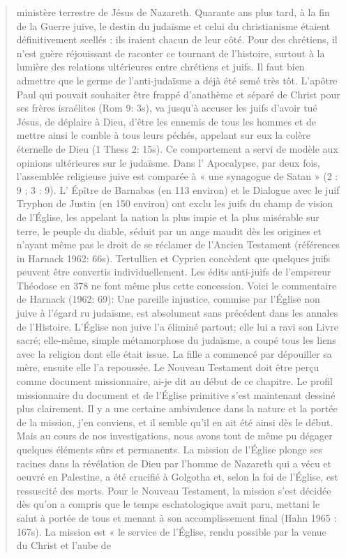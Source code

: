 \begin{quote}
    ministère terrestre de Jésus de Nazareth. Quarante ans plus tard, à la fin
de la Guerre juive, le destin du judaïsme et celui du christianisme
étaient définitivement scellés : ils iraient chacun de leur côté.
Pour des chrétiens, il n'est guère réjouissant de raconter ce tournant
de l'histoire, surtout à la lumière des relations ultérieures entre
chrétiens et juifs. Il faut bien admettre que le germe de l'anti-judaïsme
a déjà été semé très tôt. L'apôtre Paul qui pouvait souhaiter être frappé
d'anathème et séparé de Christ pour ses frères israélites (Rom 9: 3s),
va jusqu'à accuser les juifs d'avoir tué Jésus, de déplaire à Dieu, d'être
les ennemis de tous les hommes et de mettre ainsi le comble à tous
leurs péchés, appelant sur eux la colère éternelle de Dieu (1 Thess
2: 15s). Ce comportement a servi de modèle aux opinions ultérieures
sur le judaïsme. Dans l' Apocalypse, par deux fois, l'assemblée
religieuse juive est comparée à « une synagogue de Satan » (2 : 9 ;
3 : 9). L' Épître de Barnabas (en 113 environ) et le Dialogue avec le
juif Tryphon de Justin (en 150 environ) ont exclu les juifs du champ
de vision de l'Église, les appelant la nation la plus impie et la plus
misérable sur terre, le peuple du diable, séduit par un ange maudit dès
les origines et n'ayant même pas le droit de se réclamer de l'Ancien
Testament (références in Harnack 1962: 66s). Tertullien et Cyprien
concèdent que quelques juifs peuvent être convertis individuellement.
Les édits anti-juifs de l'empereur Théodose en 378 ne font même plus
cette concession. Voici le commentaire de Harnack (1962: 69):
Une pareille injustice, commise par l'Église non juive à l'égard ru
judaïsme, est absolument sans précédent dans les annales de l'Histoire.
L'Église non juive l'a éliminé partout; elle lui a ravi son Livre sacré;
elle-même, simple métamorphose du judaïsme, a coupé tous les liens avec
la religion dont elle était issue. La fille a commencé par dépouiller sa
mère, ensuite elle l'a repoussée.
Le Nouveau Testament doit être perçu comme document
missionnaire, ai-je dit au début de ce chapitre. Le profil missionnaire
du document et de l'Église primitive s'est maintenant dessiné plus
clairement. Il y a une certaine ambivalence dans la nature et la portée
de la mission, j'en conviens, et il semble qu'il en ait été ainsi dès le
début. Mais au cours de nos investigations, nous avons tout de même
pu dégager quelques éléments sûrs et permanents. La mission de
l'Église plonge ses racines dans la révélation de Dieu par l'homme de
Nazareth qui a vécu et oeuvré en Palestine, a été crucifié à Golgotha et,
selon la foi de l'Église, est ressuscité des morts. Pour le Nouveau
Testament, la mission s'est décidée dès qu'on a compris que le temps
eschatologique avait paru, mettani le salut à portée de tous et menant à
son accomplissement final (Hahn 1965 : 167s). La mission est « le
service de l'Église, rendu possible par la venue du Christ et l'aube de
\end{quote}

